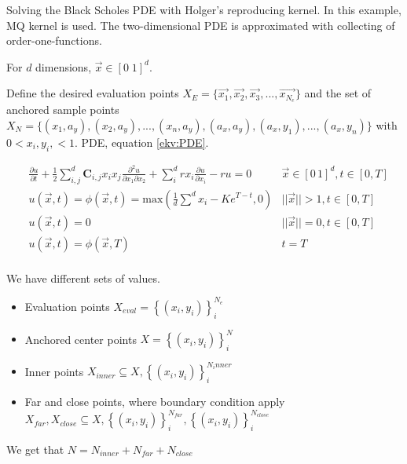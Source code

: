 \documentclass[a4paper]{article}      %
\begin{document}
Solving the Black Scholes PDE with Holger's reproducing kernel. In this example, MQ kernel is used. The two-dimensional PDE is approximated with collecting of order-one-functions. 

For $d$ dimensions, $\vec{x} \in [0\; 1]^d$.

Define the desired evaluation points $X_E = \bigl\{ \vec{x_1}, \vec{x_2}, \vec{x_3}, ..., \vec{x_{N_e}} \bigr\}$
and the set of anchored sample points  $X_N = \bigl\{ (x_1, a_y), (x_2, a_y),...,(x_n, a_y), (a_x, a_y), (a_x, y_1),...,(a_x, y_n) \bigr\}$
with $ 0 < x_i, y_i, < 1 $.
PDE, equation \ref{ekv:PDE}.

\begin{equation}
    \begin{aligned}
        &\frac{\partial u}{\partial t} + \frac{1}{2} \sum_{i, j}^d \mathbf{C}_{i,j} x_i x_j \frac{\partial^2 u}{\partial x_1 \partial x_2} + \sum_{i}^d r x_i \frac{\partial u}{\partial x_i} - ru = 0 \quad &\vec{x} \in [0\,1]^d, t \in [0, T] \\
        &u(\vec{x},t) = \phi(\vec{x}, t) = \mathrm{max}(\frac{1}{d}\sum^d x_i - Ke^{T-t}, 0)    &||\vec{x}|| > 1, t \in [0, T] \\
        &u(\vec{x}, t) = 0 &||\vec{x}|| = 0, t \in [0, T] \\
        &u(\vec{x},t) = \phi(\vec{x},T) &t = T \\
    \end{aligned}
    \label{ekv:PDE}
\end{equation}

We have different sets of values.
\begin{itemize}
\item Evaluation points  $X_{eval} = \left\{ (x_i, y_i) \right\}_i ^ {N_e}$
\item Anchored center points $X = \left\{ (x_i, y_i) \right\}_i ^ {N}$ 
\item Inner points $X_{inner}\subseteq X,\left\{ (x_i, y_i) \right\}_i ^ {N_inner}$
\item Far and close points, where boundary condition apply
$X_{far}, X_{close} \subseteq X,\left\{ (x_i, y_i) \right\}_i ^ {N_{far}}, \left\{ (x_i, y_i) \right\}_i ^ {N_{close}}$
\end{itemize}
We get that $N = N_{inner} + N_{far} + N_{close}$
\end{document}
